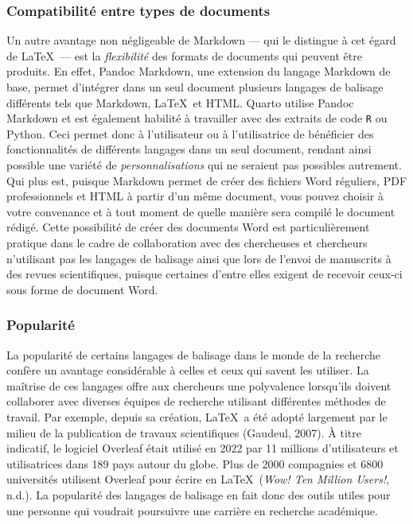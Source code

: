 \documentclass[
  letterpaper,
  DIV=11,
  numbers=noendperiod]{scrreprt}
\begin{document}
\hypertarget{compatibilituxe9-entre-types-de-documents}{%
\subsubsection{Compatibilité entre types de
documents}\label{compatibilituxe9-entre-types-de-documents}}

Un autre avantage non négligeable de Markdown --- qui le distingue à cet
égard de \LaTeX~--- est la \emph{flexibilité} des formats de documents
qui peuvent être produits. En effet, Pandoc Markdown, une extension du
langage Markdown de base, permet d'intégrer dans un seul document
plusieurs langages de balisage différents tels que Markdown, \LaTeX~et
HTML. Quarto utilise Pandoc Markdown et est également habilité à
travailler avec des extraits de code \texttt{R} ou Python. Ceci permet
donc à l'utilisateur ou à l'utilisatrice de bénéficier des
fonctionnalités de différents langages dans un seul document, rendant
ainsi possible une variété de \emph{personnalisations} qui ne seraient
pas possibles autrement. Qui plus est, puisque Markdown permet de créer
des fichiers Word réguliers, PDF professionnels et HTML à partir d'un
même document, vous pouvez choisir à votre convenance et à tout moment
de quelle manière sera compilé le document rédigé. Cette possibilité de
créer des documents Word est particulièrement pratique dans le cadre de
collaboration avec des chercheuses et chercheurs n'utilisant pas les
langages de balisage ainsi que lors de l'envoi de manuscrits à des
revues scientifiques, puisque certaines d'entre elles exigent de
recevoir ceux-ci sous forme de document Word.

\hypertarget{popularituxe9}{%
\subsubsection{Popularité}\label{popularituxe9}}

La popularité de certains langages de balisage dans le monde de la
recherche confère un avantage considérable à celles et ceux qui savent
les utiliser. La maîtrise de ces langages offre aux chercheurs une
polyvalence lorsqu'ils doivent collaborer avec diverses équipes de
recherche utilisant différentes méthodes de travail. Par exemple, depuis
sa création, \LaTeX~a été adopté largement par le milieu de la
publication de travaux scientifiques (Gaudeul, 2007). À titre indicatif,
le logiciel Overleaf était utilisé en 2022 par 11 millions
d'utilisateurs et utilisatrices dans 189 pays autour du globe. Plus de
2000 compagnies et 6800 universités utilisent Overleaf pour écrire en
\LaTeX~(\emph{Wow! {Ten} Million Users!}, n.d.). La popularité des
langages de balisage en fait donc des outils utiles pour une personne
qui voudrait poursuivre une carrière en recherche académique.
\end{document}
